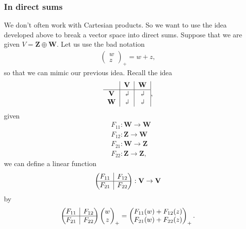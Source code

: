 \documentclass{article}
\theoremstyle{definition}
\newcommand{\V}{\mathbf{V}}
\newcommand{\W}{\mathbf{W}}
\newcommand{\Z}{\mathbf{Z}}
\newcommand{\gives}{\rotatebox[origin=c]{180}{$\Rsh$}	}
\newcommand{\rvline}{\hspace*{-\arraycolsep}\vline\hspace*{-\arraycolsep}}
\begin{document}
\subsubsection{In direct sums}
We don't often work with Cartesian products. So we want to use the idea developed above to break a vector space into direct sums. Suppose that we are given $V = \Z \oplus \W$. Let us use the bad notation
\begin{align*}
\begin{pmatrix}
w\\z
\end{pmatrix}_+ = w + z,
\end{align*}
so that we can mimic our previous idea. Recall the idea 
\begin{align*}
\begin{tabular}{c|c|c|}
& $\V$ & $\W$\\
\hline
$\V$& $\gives$& $\gives$\\	
$\W$& $\gives$ & $\gives$
\end{tabular},
\end{align*}
given 
\begin{align*}
&F_{11} : \W \to \W\\
&F_{12} : \Z \to \W\\
&F_{21} : \W \to \Z\\
&F_{22} : \Z \to \Z,
\end{align*}
we can define a linear function
\begin{align*}
\begin{pmatrix}
\begin{matrix}
F_{11}
\end{matrix}
& \rvline & F_{12} \\
\hline
F_{21} & \rvline &
F_{22}
\end{pmatrix} : \V \to \V
\end{align*}
by 
\begin{align*}
\begin{pmatrix}
\begin{matrix}
F_{11}
\end{matrix}
& \rvline & F_{12} \\
\hline
F_{21} & \rvline &
F_{22}
\end{pmatrix}\begin{pmatrix}
w\\z
\end{pmatrix}_+ = \begin{pmatrix}
F_{11}(w) + F_{12}(z)\\
F_{21}(w) + F_{22}(z)
\end{pmatrix}_+.
\end{align*}
\end{document}
